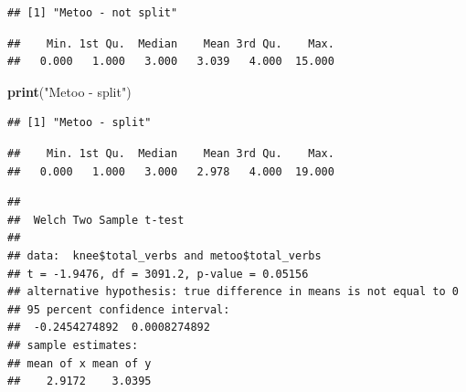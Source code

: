 \documentclass[]{article}
\newenvironment{Shaded}{\begin{snugshade}}{\end{snugshade}}
\newcommand{\KeywordTok}[1]{\textcolor[rgb]{0.13,0.29,0.53}{\textbf{#1}}}
\newcommand{\DataTypeTok}[1]{\textcolor[rgb]{0.13,0.29,0.53}{#1}}
\newcommand{\StringTok}[1]{\textcolor[rgb]{0.31,0.60,0.02}{#1}}
\newcommand{\CommentTok}[1]{\textcolor[rgb]{0.56,0.35,0.01}{\textit{#1}}}
\newcommand{\OperatorTok}[1]{\textcolor[rgb]{0.81,0.36,0.00}{\textbf{#1}}}
\newcommand{\NormalTok}[1]{#1}
\begin{document}
\begin{verbatim}
## [1] "Metoo - not split"
\end{verbatim}

\begin{Shaded}
\end{Shaded}

\begin{verbatim}
##    Min. 1st Qu.  Median    Mean 3rd Qu.    Max. 
##   0.000   1.000   3.000   3.039   4.000  15.000
\end{verbatim}

\begin{Shaded}
\begin{Highlighting}[]
\KeywordTok{print}\NormalTok{(}\StringTok{"Metoo - split"}\NormalTok{)}
\end{Highlighting}
\end{Shaded}

\begin{verbatim}
## [1] "Metoo - split"
\end{verbatim}

\begin{Shaded}
\end{Shaded}

\begin{verbatim}
##    Min. 1st Qu.  Median    Mean 3rd Qu.    Max. 
##   0.000   1.000   3.000   2.978   4.000  19.000
\end{verbatim}

\begin{Shaded}
\end{Shaded}

\begin{verbatim}
## 
##  Welch Two Sample t-test
## 
## data:  knee$total_verbs and metoo$total_verbs
## t = -1.9476, df = 3091.2, p-value = 0.05156
## alternative hypothesis: true difference in means is not equal to 0
## 95 percent confidence interval:
##  -0.2454274892  0.0008274892
## sample estimates:
## mean of x mean of y 
##    2.9172    3.0395
\end{verbatim}
\end{document}
